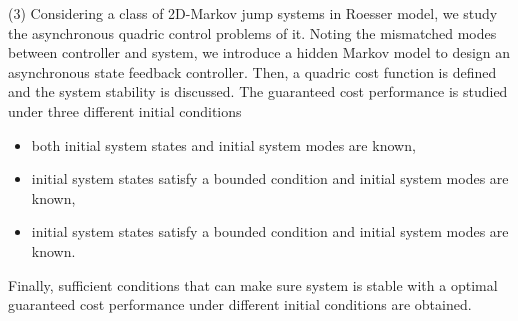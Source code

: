 \begin{eabstract}
(3) Considering a class of 2D-Markov jump systems in Roesser model, we study the asynchronous quadric control problems of it. Noting the mismatched modes between controller and system, we introduce a hidden Markov model to design an asynchronous state feedback controller. Then, a quadric cost function is defined and the system stability is discussed. The guaranteed cost performance is studied under three different initial conditions
 
 \begin{itemize}
 	\item  both initial system states  and initial system modes are known,
 	\item  initial system states satisfy a bounded condition and initial system modes are known,
 	\item  initial system states satisfy a bounded condition and initial system modes are known.
 \end{itemize}
 Finally,  sufficient conditions that can make sure system is stable with a optimal guaranteed cost performance  under different initial conditions are obtained.


\end{eabstract}

